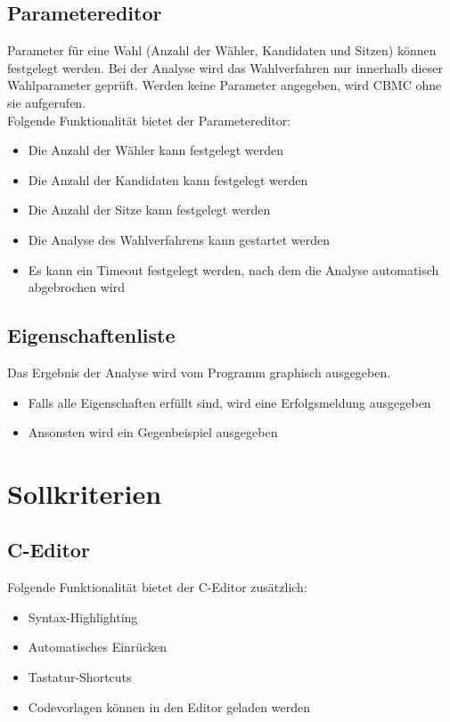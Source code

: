 \documentclass[a4paper]{scrreprt}
\begin{document}
\subsection{Parametereditor}
Parameter für eine Wahl (Anzahl der Wähler, Kandidaten und Sitzen) können festgelegt werden. Bei der Analyse wird das Wahlverfahren nur innerhalb dieser Wahlparameter geprüft. Werden keine Parameter angegeben, wird \ac{CBMC} ohne sie aufgerufen.\\
Folgende Funktionalität bietet der Parametereditor:
\begin{itemize}
	\item Die Anzahl der Wähler kann festgelegt werden
	\item Die Anzahl der Kandidaten kann festgelegt werden
	\item Die Anzahl der Sitze kann festgelegt werden
	\item Die Analyse des Wahlverfahrens kann gestartet werden
	\item Es kann ein Timeout festgelegt werden, nach dem die Analyse automatisch abgebrochen wird
\end{itemize}

\subsection{Eigenschaftenliste}
Das Ergebnis der Analyse wird vom Programm graphisch ausgegeben. 
\begin{itemize}
	\item Falls alle Eigenschaften erfüllt sind, wird eine Erfolgsmeldung ausgegeben
	\item Ansonsten wird ein Gegenbeispiel ausgegeben
\end{itemize}


\section{Sollkriterien}
\subsection{C-Editor}
Folgende Funktionalität bietet der C-Editor zusätzlich:
\begin{itemize}
	\item Syntax-Highlighting
	\item Automatisches Einrücken
	\item Tastatur-Shortcuts
	\item Codevorlagen können in den Editor geladen werden
\end{itemize}
\end{document}
